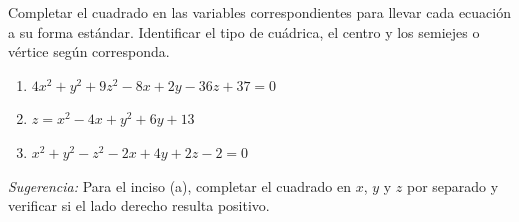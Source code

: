 Completar el cuadrado en las variables correspondientes para llevar cada ecuación a su forma estándar. Identificar el tipo de cuádrica, el centro y los semiejes o vértice según corresponda.
\begin{enumerate}
    \item $4x^2 + y^2 + 9z^2 - 8x + 2y - 36z + 37 = 0$
    \item $z = x^2 - 4x + y^2 + 6y + 13$
    \item $x^2 + y^2 - z^2 - 2x + 4y + 2z - 2 = 0$
\end{enumerate}

\textit{Sugerencia:} Para el inciso (a), completar el cuadrado en $x$, $y$ y $z$ por separado y verificar si el lado derecho resulta positivo.